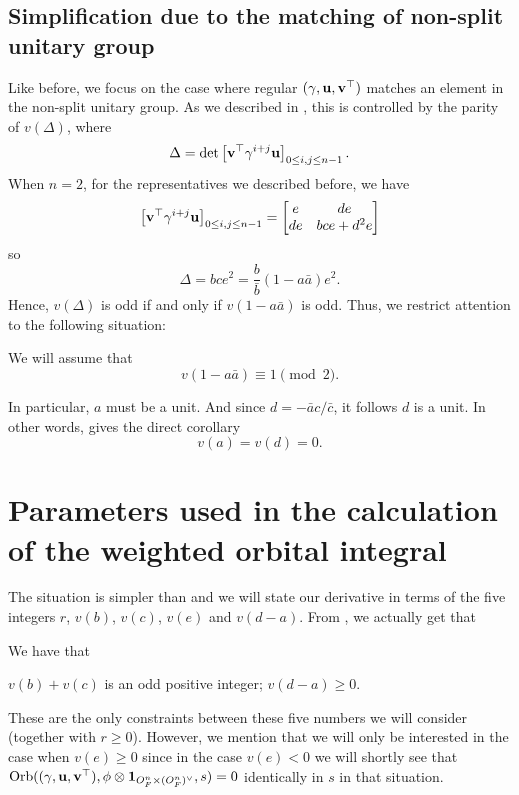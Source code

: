 \subsection{Simplification due to the matching of non-split unitary group}
Like before, we focus on the case where regular $(\gamma, \mathbf u, \mathbf v^\top)$
matches an element in the non-split unitary group.
As we described in ,
this is controlled by the parity of $v(\Delta)$, where
\[ \Delta = \det \left[ \mathbf v^\top \gamma^{i+j} \mathbf u \right]_{0 \le i,j \le n-1}. \]
When $n=2$, for the representatives we described before,
we have
\[ \left[ \mathbf v^\top \gamma^{i+j} \mathbf u \right]_{0 \le i,j \le n-1}
  = \begin{bmatrix} e & de \\ de & bce + d^2e \end{bmatrix} \]
so
\[ \Delta = bce^2 = \frac{b}{\bar b}(1-a \bar a) e^2 . \]
Hence, $v(\Delta)$ is odd if and only if $v(1-a \bar a)$ is odd.
Thus, we restrict attention to the following situation:
\begin{assume}
  \label{assume:a_odd}
  We will assume that
  \[ v(1-a \bar a) \equiv 1 \pmod 2. \]
\end{assume}
In particular, $a$ must be a unit.
And since $d = -\bar a c / \bar c$, it follows $d$ is a unit.
In other words,  gives the direct corollary
\[ v(a) = v(d) = 0. \]

\section{Parameters used in the calculation of the weighted orbital integral}
The situation is simpler than 
and we will state our derivative in terms of the five integers
$r$, $v(b)$, $v(c)$, $v(e)$ and $v(d-a)$.
From , we actually get that
\begin{assume}
  \label{assume:FJ}
  We have that
  \begin{itemize}
    \ii $v(b) + v(c)$ is an odd positive integer;
    \ii $v(d-a) \ge 0$.
  \end{itemize}
\end{assume}
These are the only constraints between these five numbers we will consider
(together with $r \ge 0$).
However, we mention that we will only be interested in the case when $v(e) \ge 0$
since in the case $v(e) < 0$ we will shortly see that
$\operatorname{Orb}({(\gamma, \mathbf u, \mathbf v^\top)}, \phi \otimes \mathbf{1}_{O_F^n \times (O_F^n)^\vee}, s) = 0$ identically in $s$ in that situation.

